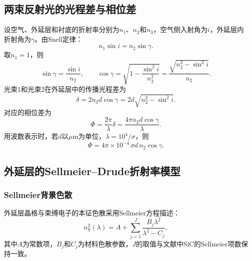 \documentclass[12pt,a4paper]{ctexart}
\begin{document}
	\subsection{两束反射光的光程差与相位差}
	设空气、外延层和衬底的折射率分别为$n_1$、$n_2$和$n_3$，空气侧入射角为$i$，外延层内折射角为$\gamma$。由Snell定律：
	\begin{equation}
		n_1\sin i = n_2\sin\gamma.
	\end{equation}
	取$n_1=1$，则
	\begin{equation}
		\sin\gamma = \frac{\sin i}{n_2},\qquad \cos\gamma = \sqrt{1 - \frac{\sin^2 i}{n_2^2}} = \frac{\sqrt{n_2^2 - \sin^2 i}}{n_2}.
	\end{equation}
	光束1和光束2在外延层中的传播光程差为
	\begin{equation}
		\delta = 2n_2 d\cos\gamma = 2d\sqrt{n_2^2 - \sin^2 i}.
		\label{eq:opd}
	\end{equation}
	对应的相位差为
	\begin{equation}
		\Phi = \frac{2\pi}{\lambda}\delta = \frac{4\pi n_2 d\cos\gamma}{\lambda}.
		\label{eq:phase}
	\end{equation}
	用波数表示时，若$d$以$\mu\mathrm{m}$为单位，$\lambda = 10^4/\sigma$，则
	\begin{equation}
		\Phi = 4\pi\times 10^{-4}\,\sigma d\, n_2\cos\gamma.
		\label{eq:phase_wavenumber}
	\end{equation}
	
	\subsection{外延层的Sellmeier–Drude折射率模型}
	
	\subsubsection{Sellmeier背景色散}
	外延层晶格与束缚电子的本征色散采用Sellmeier方程描述：
	\begin{equation}
		n_{\mathrm S}^2(\lambda) = A + \sum_{j=1}^{J} \frac{B_j\lambda^2}{\lambda^2 - C_j},
		\label{eq:sellmeier}
	\end{equation}
	其中$A$为常数项，$B_j$和$C_j$为材料色散参数，$J$的取值与文献中SiC的Sellmeier项数保持一致。
	
\end{document}
